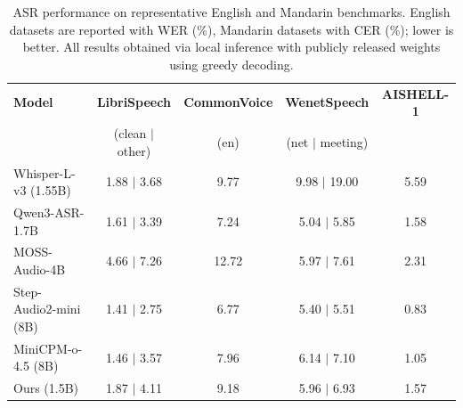\begin{table}[t]
\centering
\small
\setlength{\tabcolsep}{4pt}
\begin{tabular}{lcccc}
\toprule
\textbf{Model} & \textbf{LibriSpeech} & \textbf{CommonVoice} & \textbf{WenetSpeech} & \textbf{AISHELL-1} \\
 & (clean $|$ other) & (en) & (net $|$ meeting) & \\
\midrule
Whisper-L-v3 (1.55B) & 1.88 $|$ 3.68 & 9.77 & 9.98 $|$ 19.00 & 5.59 \\
Qwen3-ASR-1.7B       & 1.61 $|$ 3.39 & 7.24 & 5.04 $|$ 5.85  & 1.58 \\
MOSS-Audio-4B        & 4.66 $|$ 7.26 & 12.72 & 5.97 $|$ 7.61 & 2.31 \\
Step-Audio2-mini (8B) & 1.41 $|$ 2.75 & 6.77 & 5.40 $|$ 5.51 & 0.83 \\
MiniCPM-o-4.5 (8B)  & 1.46 $|$ 3.57 & 7.96 & 6.14 $|$ 7.10  & 1.05 \\
\midrule
Ours (1.5B)          & 1.87 $|$ 4.11 & 9.18 & 5.96 $|$ 6.93  & 1.57 \\
\bottomrule
\end{tabular}
\caption{ASR performance on representative English and Mandarin benchmarks. English datasets are reported with WER (\%), Mandarin datasets with CER (\%); lower is better. All results obtained via local inference with publicly released weights using greedy decoding.}%
\label{tab:asr_results}
\end{table}
